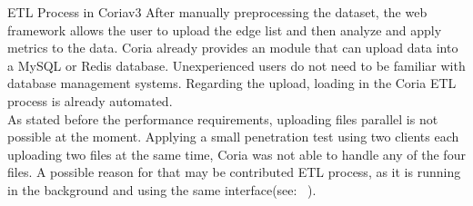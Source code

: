 \documentclass[conference, 11pt]{IEEEtran}
\begin{document}
\begin{subsection}{ETL Process in Coriav3}
After manually preprocessing the dataset, the web framework allows the user to upload the edge list and then analyze and apply metrics to the data.
Coria already provides an module that can upload data into a MySQL or Redis database. Unexperienced users do not need to be familiar with database management systems. Regarding the upload, loading in the Coria ETL process is already automated. \\ \linebreak
As stated before the performance requirements, uploading files parallel is not possible at the moment. Applying a small penetration test using two clients each uploading two files at the same time, Coria was not able to handle any of the four files. A possible reason for that may be contributed ETL process, as it is running in the background and using the same interface(see: ~).   \linebreak

\end{subsection}
\end{document}
